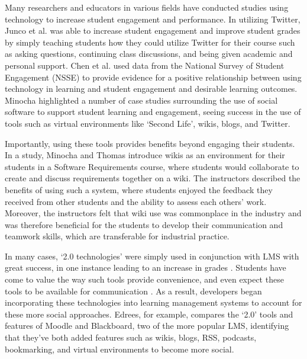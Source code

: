 Many researchers and educators in various fields have conducted studies using technology to increase student engagement and performance. In utilizing Twitter, Junco et al. \cite{junco2011effect} was able to increase student engagement and improve student grades by simply teaching students how they could utilize Twitter for their course such as asking questions, continuing class discussions, and being given academic and personal support. Chen et al. \cite{chen2010engaging} used data from the National Survey of Student Engagement (NSSE) to provide evidence for a positive relationship between using technology in learning and student engagement and desirable learning outcomes. Minocha \cite{minocha2009study} highlighted a number of case studies surrounding the use of social software to support student learning and engagement, seeing success in the use of tools such as virtual environments like `Second Life', wikis, blogs, and Twitter.

Importantly, using these tools provides benefits beyond engaging their students. In a study, Minocha and Thomas \cite{minocha2007collaborative} introduce wikis as an environment for their students in a Software Requirements course, where students would collaborate to create and discuss requirements together on a wiki. The instructors described the benefits of using such a system, where students enjoyed the feedback they received from other students and the ability to assess each others' work. Moreover, the instructors felt that wiki use was commonplace in the industry and was therefore beneficial for the students to develop their communication and teamwork skills, which are transferable for industrial practice.

In many cases, `2.0 technologies' were simply used in conjunction with LMS with great success, in one instance leading to an increase in grades \cite{conde2014evolving}. Students have come to value the way such tools provide convenience, and even expect these tools to be available for communication \cite{caruso2007ecar}. As a result, developers began incorporating these technologies into learning management systems to account for these more social approaches. Edrees, for example, \cite{edrees2013elearning} compares the `2.0' tools and features of Moodle and Blackboard, two of the more popular LMS, identifying that they’ve both added features such as wikis, blogs, RSS, podcasts, bookmarking, and virtual environments to become more social.

